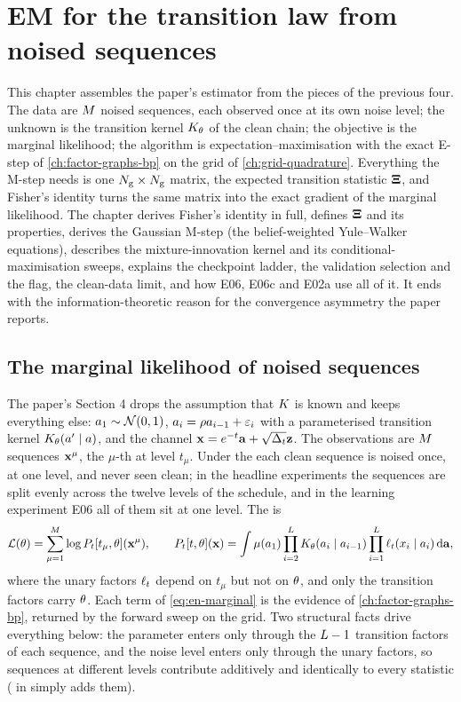 \chapter{EM for the transition law from noised sequences}
\label{ch:em-through-noise}

This chapter assembles the paper's estimator from the pieces of the previous four. The
data are $M$ noised sequences, each observed once at its own noise level; the
unknown is the transition kernel $K_{\theta}$ of the clean chain; the objective is the
marginal likelihood; the algorithm is expectation--maximisation with the exact E-step
of \cref{ch:factor-graphs-bp} on the grid of \cref{ch:grid-quadrature}. Everything the
M-step needs is one $N_{\mathrm{g}}\times N_{\mathrm{g}}$ matrix, the expected transition statistic
$\mathbf{\Xi}$, and Fisher's identity turns the same matrix into the exact gradient of the
marginal likelihood. The chapter derives Fisher's identity in full, defines $\mathbf{\Xi}$ and
its properties, derives the Gaussian M-step (the belief-weighted Yule--Walker
equations), describes the mixture-innovation kernel and its conditional-maximisation
sweeps, explains the checkpoint ladder, the validation selection and the
 flag, the clean-data limit, and how E06, E06c and E02a use all of it. It
ends with the information-theoretic reason for the convergence asymmetry the paper
reports.

\section{The marginal likelihood of noised sequences}

The paper's Section 4 drops the assumption that $K$ is known and keeps
everything else: $a_1\sim\mathcal{N}\!\left(0,1\right)$, $a_i=\rho a_{i-1}+\varepsilon_i$ with a
parameterised transition kernel $K_{\theta}(a'\mid a)$, and the channel
$\mathbf{x}=e^{-t}\mathbf{a}+\sqrt{\Delta_t}\mathbf{z}$. The observations are $M$ sequences $\mathbf{x}^\mu$, the
$\mu$-th at level $t_\mu$. Under the  each clean sequence is
noised once, at one level, and never seen clean; in the headline experiments the
sequences are split evenly across the twelve levels of the schedule, and in the
learning experiment E06 all of them sit at one level. The  is
\begin{equation}
  \mathcal{L}(\theta)=\sum_{\mu=1}^{M}\log P_t[t_\mu,\theta](\mathbf{x}^\mu),\qquad
  P_t[t,\theta](\mathbf{x})=\int\mu(a_1)\prod_{i=2}^{L}K_{\theta}(a_i\mid a_{i-1})
  \prod_{i=1}^{L}\ell_t(x_i\mid a_i)\,\mathrm{d}\mathbf{a},
  \label{eq:en-marginal}
\end{equation}
where the unary factors $\ell_t$ depend on $t_\mu$ but not on $\theta$, and only the
transition factors carry $\theta$. Each term of \cref{eq:en-marginal} is the evidence
of \cref{ch:factor-graphs-bp}, returned by the forward sweep on the grid. Two structural
facts drive everything below: the parameter enters only through the $L-1$
transition factors of each sequence, and the noise level enters only through the unary
factors, so sequences at different levels contribute additively and identically to
every statistic ( in  simply adds
them).


